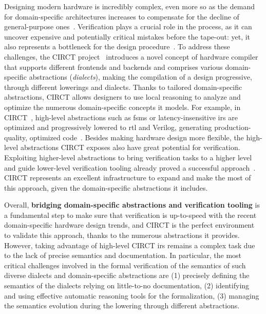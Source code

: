 \documentclass[sigconf,authorversion,nonacm, 11pt]{acmart}
\begin{document}
Designing modern hardware is incredibly complex, even more so as the demand for domain-specific architectures increases to compensate for the decline of general-purpose ones~\cite{asanovic2006landscape, hennessy2018new}. 
Verification plays a crucial role in the process, as it can uncover expensive and potentially critical mistakes before the tape-out: yet, it also represents a bottleneck for the design procedure~\cite{foster2013design, wilson2020verifstudy, vasudevan2021learning}. 
To address these challenges, the CIRCT project~\cite{circt, mlir_circt} introduces a novel concept of hardware compiler that supports different frontends and backends and comprises various domain-specific abstractions (\textit{dialects}), making the compilation of a design progressive, through different lowerings and dialects. 
Thanks to tailored domain-specific abstractions, CIRCT allows designers to use local reasoning to analyze and optimize the numerous domain-specific concepts it models.
For example, in CIRCT~\cite{circt, mlir_circt}, high-level abstractions such as \acp{fsm} or latency-insensitive \acp{ir} are optimized and progressively lowered to \ac{rtl} and Verilog, generating production-quality, optimized code~\cite{circt_sifive}. 
Besides making hardware design more flexible, the high-level abstractions CIRCT exposes also have great potential for verification.
Exploiting higher-level abstractions to bring verification tasks to a higher level and guide lower-level verification tooling already proved a successful approach~\cite{huang2018instruction, chen2021leveraging, mattarei2018cosa, hunt2006sat}.
CIRCT represents an excellent infrastructure to expand and make the most of this approach, given the domain-specific abstractions it includes.

Overall, \textbf{bridging domain-specific abstractions and verification tooling} is a fundamental step to make sure that verification is up-to-speed with the recent domain-specific hardware design trends, and CIRCT is the perfect environment to validate this approach, thanks to the numerous abstractions it provides. 
However, taking advantage of high-level CIRCT \acp{ir} remains a complex task due to the lack of precise semantics and documentation. 
In particular, the most critical challenges involved in the formal verification of the semantics of such diverse dialects and domain-specific abstractions are 
(1) precisely defining the semantics of the dialects relying on little-to-no documentation, 
(2) identifying and using effective automatic reasoning tools for the formalization, 
(3) managing the semantics evolution during the lowering through different abstractions. 
\end{document}
